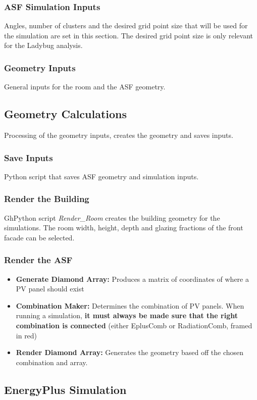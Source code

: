 	\subsubsection{ASF Simulation Inputs}
	Angles, number of clusters and the desired grid point size that will be used for the simulation are set in this section. The desired grid point size is only relevant for the Ladybug analysis.

	\subsubsection{Geometry Inputs}
	General inputs for the room and the ASF geometry. 

	\subsection{Geometry Calculations}
	Processing of the geometry inputs, creates the geometry and saves inputs.
	\subsubsection{Save Inputs}
	Python script that saves ASF geometry and simulation inputs.

	\subsubsection{Render the Building}
	GhPython script \emph{Render\_Room} creates the building geometry for the simulations. The room width, height, depth and glazing fractions of the front facade can be selected.

	\subsubsection{Render the ASF}
	\begin{itemize}
	\item{{\bf Generate Diamond Array:} Produces a matrix of coordinates of where a PV panel should exist}
	\item{{\bf Combination Maker:} Determines the combination of PV panels. When running a simulation, {\bf it must always be made sure that the right combination is connected} (either EplusComb or RadiationComb, framed in red)}
	\item{{\bf Render Diamond Array:} Generates the geometry based off the chosen combination and array.}
	\end{itemize}

	\subsection{EnergyPlus Simulation}

